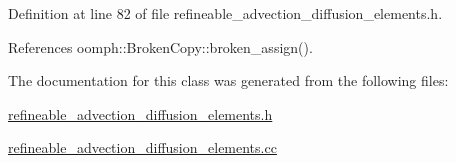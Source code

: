 Definition at line 82 of file refineable\+\_\+advection\+\_\+diffusion\+\_\+elements.\+h.



References oomph\+::\+Broken\+Copy\+::broken\+\_\+assign().



The documentation for this class was generated from the following files\+:\begin{DoxyCompactItemize}
\item 
\hyperlink{refineable__advection__diffusion__elements_8h}{refineable\+\_\+advection\+\_\+diffusion\+\_\+elements.\+h}\item 
\hyperlink{refineable__advection__diffusion__elements_8cc}{refineable\+\_\+advection\+\_\+diffusion\+\_\+elements.\+cc}\end{DoxyCompactItemize}
